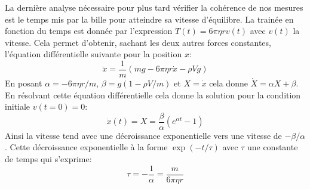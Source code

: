 La dernière analyse nécessaire pour plus tard vérifier la cohérence de nos mesures est le temps mis par la bille pour atteindre sa vitesse d'équilibre. La trainée en fonction du temps est donnée par l'expression $T(t) = 6\pi \eta r v(t)$ avec $v(t)$ la vitesse. Cela permet d'obtenir, sachant les deux autres forces constantes, l'équation différentielle suivante pour la position $x$:
\begin{equation}
    \ddot{x} = \frac{1}{m}(mg - 6\pi \eta r \dot{x} - \rho V g)
\end{equation}
En posant $\alpha = -6\pi \eta r / m$, $\beta = g(1-\rho V/m)$ et $X = \dot{x}$ cela donne $\dot{X} = \alpha X + \beta$. En résolvant cette équation différentielle cela donne la solution pour la condition initiale $v(t=0)=0$:
\begin{equation}
    \dot{x}(t) = X = \frac{\beta}{\alpha}(e^{\alpha t} - 1)
\end{equation}
Ainsi la vitesse tend avec une décroissance exponentielle vers une vitesse de $-\beta/\alpha$. Cette décroissance exponentielle à la forme $\exp(-t/\tau)$ avec $\tau$ une constante de temps qui s'exprime:
\begin{equation}
    \tau = -\frac{1}{\alpha} = \frac{m}{6\pi \eta r}
    \label{eq:constante_temps}
\end{equation}
